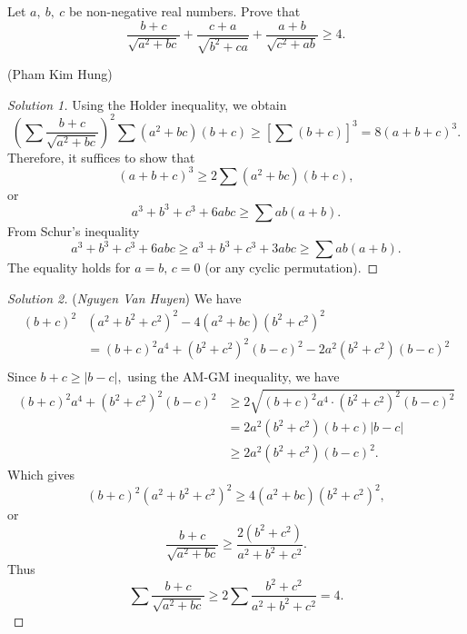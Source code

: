 \documentclass[12pt,a4paper]{book}
\begin{document}
\begin{pro_no_count}
Let $a, \ b, \ c$ be non-negative real numbers. Prove that
$$\frac{b+c}{\sqrt{a^{2}+bc}} + \frac{c+a}{\sqrt{b^{2}+ca}} + \frac{a+b}{\sqrt{c^{2}+ab}} \geqslant 4.$$
\begin{flushright}(Pham Kim Hung)\end{flushright}
\end{pro_no_count}

\begin{proof}[\cmss\problemColor Solution 1]
Using the Holder inequality, we obtain
\[\left(\sum \frac{b+c}{\sqrt{a^{2}+bc}}\right)^2 \sum (a^{2}+bc)(b+c) \ge \left[\sum (b+c)\right]^3 = 8(a+b+c)^3.\]
Therefore, it suffices to show that
\[(a+b+c)^3 \ge 2\sum (a^{2}+bc)(b+c),\]
or
\[a^3+b^3+c^3+6abc \ge \sum ab(a+b).\]
From Schur’s inequality
\[a^3+b^3+c^3+6abc \geqslant a^3+b^3+c^3+3abc \ge \sum ab(a+b).\]
The equality holds for $a=b,\,c=0$  (or any cyclic permutation).
\end{proof}

\begin{proof}[\cmss\problemColor Solution 2]
(\textit{Nguyen Van Huyen}) We have
\[\begin{aligned}
(b+c)^2&(a^2+b^2+c^2)^2-4(a^2+bc)(b^2+c^2)^2 \\
& = (b+c)^2a^4 + (b^2+c^2)^2(b-c)^2 - 2a^2(b^2+c^2)(b-c)^2 \\
\end{aligned}\]
Since $b+c \ge |b-c|,$ using the AM-GM inequality, we have
\[\begin{aligned} 
(b+c)^2a^4 + (b^2+c^2)^2(b-c)^2 & \ge 2\sqrt{(b+c)^2a^4 \cdot (b^2+c^2)^2(b-c)^2} \\
& = 2a^2(b^2+c^2)(b+c)|b-c| \\
& \geqslant 2a^2(b^2+c^2)(b-c)^2.
\end{aligned}\]
Which gives
\[(b+c)^2(a^2+b^2+c^2)^2 \geqslant 4(a^2+bc)(b^2+c^2)^2,\]
or
\[\frac{b+c}{\sqrt{a^{2}+bc}} \geqslant \frac{2(b^2+c^2)}{a^2+b^2+c^2}.\]
Thus
\[\sum \frac{b+c}{\sqrt{a^{2}+bc}} \geqslant 2 \sum \frac{b^2+c^2}{a^2+b^2+c^2} = 4.\]
\end{proof}

\newpage 
\end{document}
